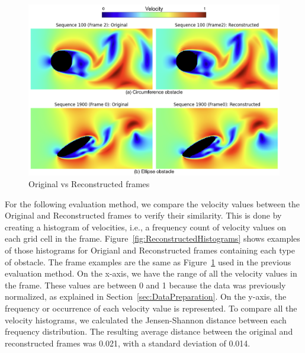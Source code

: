 \begin{figure}[!htbp]
    \centering
    \includegraphics[width=1\linewidth]{images/autoencoder_frames.png}
    \caption{Original vs Reconstructed frames}
    \label{fig:ReconstructedFrames}
\end{figure}

For the following evaluation method, we compare the velocity values between the Original and Reconstructed frames to verify their similarity. This is done by creating a histogram of velocities, i.e., a frequency count of velocity values on each grid cell in the frame. Figure~\ref{fig:ReconstructedHistograms} shows examples of those histograms for Origianl and Reconstructed frames containing each type of obstacle. The frame examples are the same as Figure~\ref{fig:ReconstructedFrames} used in the previous evaluation method. On the x-axis, we have the range of all the velocity values in the frame. These values are between 0 and 1 because the data was previously normalized, as explained in Section~\ref{sec:DataPreparation}. On the y-axis, the frequency or occurrence of each velocity value is represented. To compare all the velocity histograms, we calculated the Jensen-Shannon distance between each frequency distribution. The resulting average distance between the original and reconstructed frames was 0.021, with a standard deviation of 0.014.


